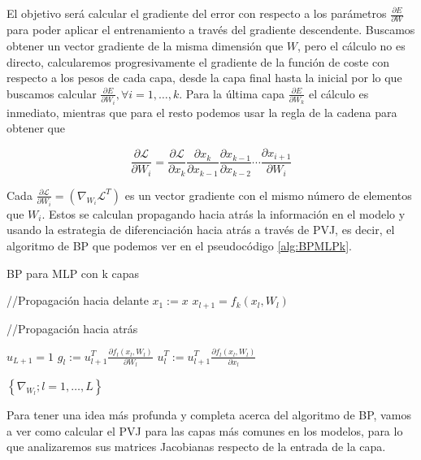 El objetivo será calcular el gradiente del error con respecto a los parámetros $\frac{\partial E}{\partial W}$  para poder aplicar el entrenamiento a través del gradiente descendente. Buscamos obtener un vector gradiente de la misma dimensión que $W$, pero el cálculo no es directo, calcularemos progresivamente el gradiente de la función de coste con respecto a los pesos de cada capa, desde la capa final hasta la inicial por lo que buscamos calcular $\frac{\partial E}{\partial W_i}, \forall i=1,\ldots,k$.  Para la última capa $\frac{\partial E}{\partial W_k}$ el cálculo es inmediato, mientras que para el resto podemos usar la regla de la cadena para obtener que 

$$\frac{\partial \mathcal{L}}{\partial W_i}=\frac{\partial \mathcal{L}}{\partial x_k} \frac{\partial x_k}{\partial x_{k-1}} \frac{\partial x_{k-1}}{\partial x_{k-2}} \cdots \frac{\partial x_{i+1}}{\partial W_i}$$

Cada $\frac{\partial \mathcal{L}}{\partial W_i}= \left ( \nabla_{W_i} \mathcal{L}^T \right )$ es un vector gradiente con el mismo número de elementos que $W_i$. Estos se calculan propagando hacia atrás la información en el modelo y usando la estrategia de diferenciación hacia atrás a través de PVJ, es decir, el algoritmo de BP que podemos ver en el pseudocódigo \ref{alg:BPMLPk}. 



\begin{algorithm}
\caption{BP para MLP con k capas}
\label{alg:BPMLPk}
    \begin{algorithmic}
        \State //Propagación hacia delante
        \State $x_1:=x$
            \State $x_{l+1}=f_k(x_l, W_l)$
        \EndFor

        \State //Propagación hacia atrás

        \State $u_{L+1}=1$
            \State $g_l:= u_{l+1}^T \frac{\partial f_l(x_l, W_l)}{\partial W_l}$
            \State $u_l^T:=u_{l+1}^T\frac{\partial f_l(x_l, W_l)}{\partial x_l}$
        \EndFor
            

        \Return $\left \{  \nabla_{W_l}; l=1,\ldots,L \right \}$
    \end{algorithmic}
\end{algorithm}


Para tener una idea más profunda y completa acerca del algoritmo de BP, vamos a ver como calcular el PVJ para las capas más comunes en los modelos, para lo que analizaremos sus matrices Jacobianas respecto de la entrada de la capa. 



